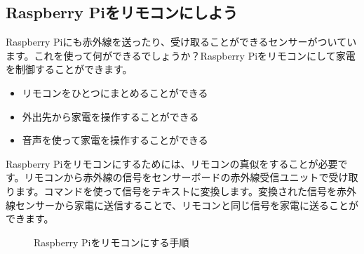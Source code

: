 \subsection{Raspberry Piをリモコンにしよう}

Raspberry Piにも赤外線を送ったり、受け取ることができるセンサーがついています。これを使って何ができるでしょうか？Raspberry Piをリモコンにして家電を制御することができます。

\begin{itemize}
\item リモコンをひとつにまとめることができる
\item 外出先から家電を操作することができる
\item 音声を使って家電を操作することができる
\end{itemize}

Raspberry Piをリモコンにするためには、リモコンの真似をすることが必要です。リモコンから赤外線の信号をセンサーボードの赤外線受信ユニットで受け取ります。コマンドを使って信号をテキストに変換します。変換された信号を赤外線センサーから家電に送信することで、リモコンと同じ信号を家電に送ることができます。

\begin{figure}[H]
    \centering
 
    \caption{Raspberry Piをリモコンにする手順}
\end{figure}

